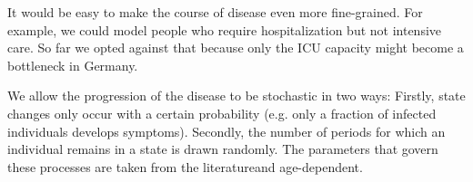It would be easy to make the course of disease even more fine-grained. For example, we
could model people who require hospitalization but not intensive care. So far we opted
against that because only the ICU capacity might become a bottleneck in Germany.

We allow the progression of the disease to be stochastic in two ways: Firstly, state
changes only occur with a certain probability (e.g. only a fraction of infected
individuals develops symptoms). Secondly, the number of periods for which an individual
remains in a state is drawn randomly. The parameters that govern these processes are
taken from the literature\footnotemark and age-dependent.

